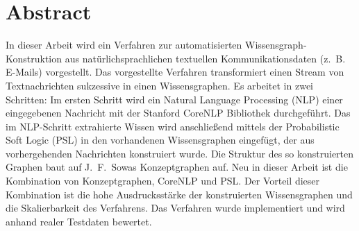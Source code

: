 %
\chapter*{Abstract}%
\label{sec:abstract}
\vspace*{-10mm}

In dieser Arbeit wird ein Verfahren zur automatisierten Wissensgraph-Konstruktion aus natürlichsprachlichen textuellen Kommunikationsdaten (z.~B. E-Mails) vorgestellt.
Das vorgestellte Verfahren transformiert einen Stream von Textnachrichten sukzessive in einen Wissensgraphen.
Es arbeitet in zwei Schritten:
Im ersten Schritt wird ein Natural Language Processing (NLP) einer eingegebenen Nachricht mit der Stanford CoreNLP Bibliothek durchgeführt.
Das im NLP-Schritt extrahierte Wissen wird anschließend mittels der Probabilistic Soft Logic (PSL) in den vorhandenen Wissensgraphen eingefügt, der aus vorhergehenden Nachrichten konstruiert wurde.
Die Struktur des so konstruierten Graphen baut auf J.~F.~Sowas Konzeptgraphen auf.
Neu in dieser Arbeit ist die Kombination von Konzeptgraphen, CoreNLP und PSL.\@
Der Vorteil dieser Kombination ist die hohe Ausdrucksstärke der konstruierten Wissensgraphen und die Skalierbarkeit des Verfahrens.
Das Verfahren wurde implementiert und wird anhand realer Testdaten bewertet.

